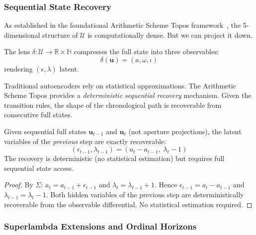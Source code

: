 \subsubsection{Sequential State Recovery}

As established in the foundational Arithmetic Scheme Topos framework~\cite{larue_lc}, the 5-dimensional structure of $\mathcal{U}$ is computationally dense. But we can project it down.

\begin{definition}
The lens $\delta : \mathcal{U} \to \mathbb{R} \times \mathbb{H}$ compresses the full state into three observables:
$$\delta(\mathbf{u}) = (a, \omega, \iota)$$
rendering $({\epsilon, \lambda})$ latent.
\end{definition}

Traditional autoencoders rely on statistical approximations. The Arithmetic Scheme Topos provides a \emph{deterministic sequential recovery} mechanism. Given the transition rules, the shape of the chronological path is recoverable from consecutive full states.

\begin{theorem}
Given sequential full states $\mathbf{u}_{t-1}$ and $\mathbf{u}_t$ (not aperture projections), the latent variables of the \emph{previous} step are exactly recoverable:
$$(\epsilon_{t-1}, \lambda_{t-1}) = (a_t - a_{t-1},\; \lambda_t - 1)$$
The recovery is deterministic (no statistical estimation) but requires full sequential state access.
\end{theorem}

\begin{proof}
By $\Sigma$: $a_t = a_{t-1} + \epsilon_{t-1}$ and $\lambda_t = \lambda_{t-1} + 1$. Hence $\epsilon_{t-1} = a_t - a_{t-1}$ and $\lambda_{t-1} = \lambda_t - 1$. Both hidden variables of the previous step are deterministically recoverable from the observable differential. No statistical estimation required. \qedhere
\end{proof}

\subsubsection{Superlambda Extensions and Ordinal Horizons}

